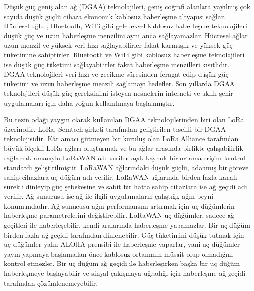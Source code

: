 Düşük güç geniş alan ağ (DGAA) teknolojileri, geniş coğrafi alanlara yayılmış çok sayıda düşük güçlü cihaza ekonomik kablosuz haberleşme altyapısı sağlar. Hücresel ağlar, Bluetooth, WiFi gibi geleneksel kablosuz haberleşme teknolojileri düşük güç ve uzun haberleşme menzilini aynı anda sağlayamazlar. Hücresel ağlar uzun menzil ve yüksek veri hızı sağlayabilirler fakat karmaşık ve yüksek güç tüketimine sahiptirler. Bluetooth ve WiFi gibi kablosuz haberleşme teknolojileri ise düşük güç tüketimi sağlayabilirler fakat haberleşme menzilleri kısıtlıdır. DGAA teknolojileri veri hızı ve gecikme süresinden feragat edip düşük güç tüketimi ve uzun haberleşme menzili sağlamayı hedefler. Son yıllarda DGAA teknolojileri düşük güç gereksinimi isteyen nesnelerin interneti ve akıllı şehir uygulamaları için daha yoğun kullanılmaya başlanmıştır.

Bu tezin odağı yaygın olarak kullanılan DGAA teknolojilerinden biri olan LoRa üzerinedir. LoRa, Semtech şirketi tarafından geliştirilen tescilli bir DGAA teknolojisidir. Kâr amacı gütmeyen bir kuruluş olan LoRa Alliance tarafından büyük ölçekli LoRa ağları oluşturmak ve bu ağlar arasında birlikte çalışabilirlik sağlamak amacıyla LoRaWAN adı verilen açık kaynak bir ortama erişim kontrol standardı geliştirilmiştir. LoRaWAN ağlarındaki düşük güçlü, adanmış bir göreve sahip cihazlara uç düğüm adı verilir. LoRaWAN ağlarında birden fazla kanalı sürekli dinleyip güç şebekesine ve sabit bir hatta sahip cihazlara ise ağ geçidi adı verilir. Ağ sunucusu ise ağ ile ilgili uygulamaların çalıştığı, ağın beyni konumundadır. Ağ sunucusu ağın performansını artırmak için uç düğümlerin haberleşme parametrelerini değiştirebilir. LoRaWAN uç düğümleri sadece ağ geçitleri ile haberleşebilir, kendi aralarında haberleşme yapamazlar. Bir uç düğüm birden fazla ağ geçidi tarafından dinlenebilir. Güç tüketimini düşük tutmak için uç düğümler yalın ALOHA prensibi ile haberleşme yaparlar, yani uç düğümler yayın yapmaya başlamadan önce kablosuz ortamının müsait olup olmadığını kontrol etmezler. Bir uç düğüm ağ geçidi ile haberleşirken başka bir uç düğüm haberleşmeye başlayabilir ve sinyal çakışmaya uğradığı için haberleşme ağ geçidi tarafından çözümlenemeyebilir.

